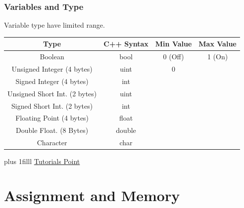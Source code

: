 \documentclass[fleqn]{beamer} %
\newcommand{\sectiontitleII}{Variables and Type}
\newcommand{\sectiontitleIII}{Assignment and Memory}
\newcommand{\btVFill}{\vskip0pt plus 1filll}
\begin{document}
	\begin{frame} \small
	\frametitle{\sectiontitleII}
	
	Variable type have limited range. \vspace{2mm}\\
	\renewcommand*{\arraystretch}{1.5}
	\begin{tabular}{|c|c|c|c|}\hline			
		Type & C++ Syntax & Min Value & Max Value  \\ \hline
		Boolean & bool &  0 (Off) & 1 (On) \\ \hline 	
		Unsigned Integer (4 bytes) & uint &  0 &  \\ \hline
		Signed Integer (4 bytes) & int &   &  \\ \hline
		Unsigned Short Int. (2 bytes) & uint &   &  \\ \hline
		Signed Short Int. (2 bytes) & int &   &  \\ \hline
		Floating Point (4 bytes) & float &  & \\ \hline
		Double Float. (8 Bytes) & double &  &\\ \hline
		Character & char &  &\\ \hline	 			
		
	\end{tabular}
	
	\btVFill
	{\tiny \href{https://www.tutorialspoint.com/cplusplus/cpp_data_types.htm}{Tutorials Point}}
\end{frame}


\section{\sectiontitleIII}
\end{document}
